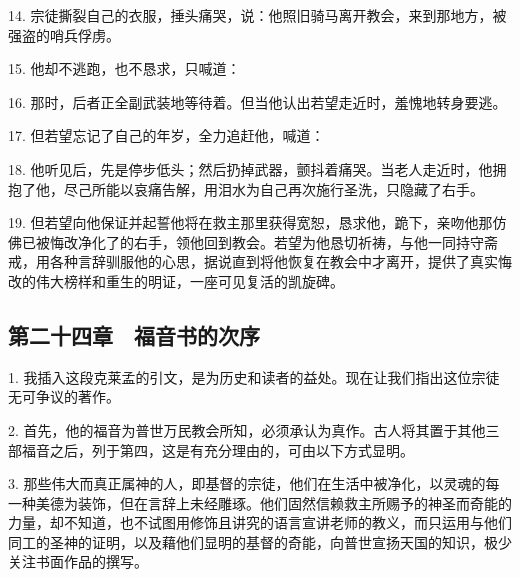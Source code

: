 14. 宗徒撕裂自己的衣服，捶头痛哭，说：他照旧骑马离开教会，来到那地方，被强盗的哨兵俘虏。\par

15. 他却不逃跑，也不恳求，只喊道：\par

16. 那时，后者正全副武装地等待着。但当他认出若望走近时，羞愧地转身要逃。\par

17. 但若望忘记了自己的年岁，全力追赶他，喊道：\par

18. 他听见后，先是停步低头；然后扔掉武器，颤抖着痛哭。当老人走近时，他拥抱了他，尽己所能以哀痛告解，用泪水为自己再次施行圣洗，只隐藏了右手。\par

19. 但若望向他保证并起誓他将在救主那里获得宽恕，恳求他，跪下，亲吻他那仿佛已被悔改净化了的右手，领他回到教会。若望为他恳切祈祷，与他一同持守斋戒，用各种言辞驯服他的心思，据说直到将他恢复在教会中才离开，提供了真实悔改的伟大榜样和重生的明证，一座可见复活的凯旋碑。\par


\subsection{第二十四章　福音书的次序}

1. 我插入这段克莱孟的引文，是为历史和读者的益处。现在让我们指出这位宗徒无可争议的著作。\par

2. 首先，他的福音为普世万民教会所知，必须承认为真作。古人将其置于其他三部福音之后，列于第四，这是有充分理由的，可由以下方式显明。\par

3. 那些伟大而真正属神的人，即基督的宗徒，他们在生活中被净化，以灵魂的每一种美德为装饰，但在言辞上未经雕琢。他们固然信赖救主所赐予的神圣而奇能的力量，却不知道，也不试图用修饰且讲究的语言宣讲老师的教义，而只运用与他们同工的圣神的证明，以及藉他们显明的基督的奇能，向普世宣扬天国的知识，极少关注书面作品的撰写。\par

